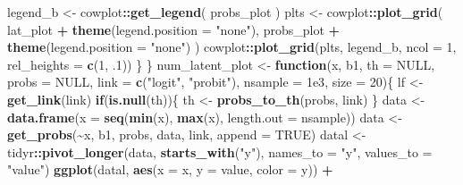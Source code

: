 \documentclass[
  man,floatsintext]{apa6}
\newenvironment{Shaded}{\begin{snugshade}}{\end{snugshade}}
\newcommand{\AttributeTok}[1]{\textcolor[rgb]{0.13,0.29,0.53}{#1}}
\newcommand{\ConstantTok}[1]{\textcolor[rgb]{0.56,0.35,0.01}{#1}}
\newcommand{\ControlFlowTok}[1]{\textcolor[rgb]{0.13,0.29,0.53}{\textbf{#1}}}
\newcommand{\DecValTok}[1]{\textcolor[rgb]{0.00,0.00,0.81}{#1}}
\newcommand{\FloatTok}[1]{\textcolor[rgb]{0.00,0.00,0.81}{#1}}
\newcommand{\FunctionTok}[1]{\textcolor[rgb]{0.13,0.29,0.53}{\textbf{#1}}}
\newcommand{\NormalTok}[1]{#1}
\newcommand{\OtherTok}[1]{\textcolor[rgb]{0.56,0.35,0.01}{#1}}
\newcommand{\SpecialCharTok}[1]{\textcolor[rgb]{0.81,0.36,0.00}{\textbf{#1}}}
\newcommand{\StringTok}[1]{\textcolor[rgb]{0.31,0.60,0.02}{#1}}
\begin{document}
\begin{Shaded}
\begin{Highlighting}[]
\NormalTok{    legend\_b }\OtherTok{\textless{}{-}}\NormalTok{ cowplot}\SpecialCharTok{::}\FunctionTok{get\_legend}\NormalTok{(}
\NormalTok{      probs\_plot}
\NormalTok{    )}
\NormalTok{    plts }\OtherTok{\textless{}{-}}\NormalTok{ cowplot}\SpecialCharTok{::}\FunctionTok{plot\_grid}\NormalTok{(}
\NormalTok{      lat\_plot }\SpecialCharTok{+} \FunctionTok{theme}\NormalTok{(}\AttributeTok{legend.position =} \StringTok{"none"}\NormalTok{),}
\NormalTok{      probs\_plot }\SpecialCharTok{+} \FunctionTok{theme}\NormalTok{(}\AttributeTok{legend.position =} \StringTok{"none"}\NormalTok{)}
\NormalTok{    )}
\NormalTok{    cowplot}\SpecialCharTok{::}\FunctionTok{plot\_grid}\NormalTok{(plts, legend\_b, }\AttributeTok{ncol =} \DecValTok{1}\NormalTok{, }\AttributeTok{rel\_heights =} \FunctionTok{c}\NormalTok{(}\DecValTok{1}\NormalTok{, .}\DecValTok{1}\NormalTok{))}
\NormalTok{  \}}
\NormalTok{\}}
\NormalTok{num\_latent\_plot }\OtherTok{\textless{}{-}} \ControlFlowTok{function}\NormalTok{(x, }
\NormalTok{                            b1, }
                            \AttributeTok{th =} \ConstantTok{NULL}\NormalTok{, }
                            \AttributeTok{probs =} \ConstantTok{NULL}\NormalTok{,}
                            \AttributeTok{link =} \FunctionTok{c}\NormalTok{(}\StringTok{"logit"}\NormalTok{, }\StringTok{"probit"}\NormalTok{), }
                            \AttributeTok{nsample =} \FloatTok{1e3}\NormalTok{, }
                            \AttributeTok{size =} \DecValTok{20}\NormalTok{)\{}
\NormalTok{  lf }\OtherTok{\textless{}{-}} \FunctionTok{get\_link}\NormalTok{(link)}
  \ControlFlowTok{if}\NormalTok{(}\FunctionTok{is.null}\NormalTok{(th))\{}
\NormalTok{    th }\OtherTok{\textless{}{-}} \FunctionTok{probs\_to\_th}\NormalTok{(probs, link)}
\NormalTok{  \}}
\NormalTok{  data }\OtherTok{\textless{}{-}} \FunctionTok{data.frame}\NormalTok{(}\AttributeTok{x =} \FunctionTok{seq}\NormalTok{(}\FunctionTok{min}\NormalTok{(x), }\FunctionTok{max}\NormalTok{(x), }\AttributeTok{length.out =}\NormalTok{ nsample))}
\NormalTok{  data }\OtherTok{\textless{}{-}} \FunctionTok{get\_probs}\NormalTok{(}\SpecialCharTok{\textasciitilde{}}\NormalTok{x, b1, probs, data, link, }\AttributeTok{append =} \ConstantTok{TRUE}\NormalTok{)}
\NormalTok{  datal }\OtherTok{\textless{}{-}}\NormalTok{ tidyr}\SpecialCharTok{::}\FunctionTok{pivot\_longer}\NormalTok{(data, }\FunctionTok{starts\_with}\NormalTok{(}\StringTok{"y"}\NormalTok{), }\AttributeTok{names\_to =} \StringTok{"y"}\NormalTok{, }\AttributeTok{values\_to =} \StringTok{"value"}\NormalTok{)}
  \FunctionTok{ggplot}\NormalTok{(datal, }\FunctionTok{aes}\NormalTok{(}\AttributeTok{x =}\NormalTok{ x, }\AttributeTok{y =}\NormalTok{ value, }\AttributeTok{color =}\NormalTok{ y)) }\SpecialCharTok{+}

\end{Highlighting}
\end{Shaded}
\end{document}
